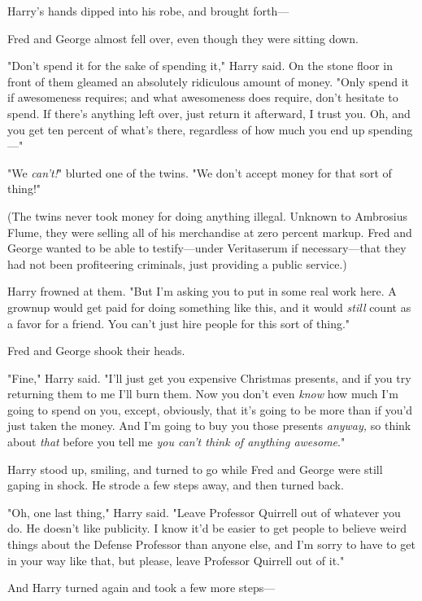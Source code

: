 Harry's hands dipped into his robe, and brought forth---

Fred and George almost fell over, even though they were sitting down.

"Don't spend it for the sake of spending it," Harry said. On the stone floor in
front of them gleamed an absolutely ridiculous amount of money. "Only spend it
if awesomeness requires; and what awesomeness does require, don't hesitate to
spend. If there's anything left over, just return it afterward, I trust you.
Oh, and you get ten percent of what's there, regardless of how much you end up
spending\mbox{---}"

"We \emph{can't!}" blurted one of the twins. "We don't accept money for that
sort of thing!"

(The twins never took money for doing anything illegal. Unknown to Ambrosius
Flume, they were selling all of his merchandise at zero percent markup. Fred
and George wanted to be able to testify---under Veritaserum if necessary---that
they had not been profiteering criminals, just providing a public service.)

Harry frowned at them. "But I'm asking you to put in some real work here. A
grownup would get paid for doing something like this, and it would \emph{still}
count as a favor for a friend. You can't just hire people for this sort of
thing."

Fred and George shook their heads.

"Fine," Harry said. "I'll just get you expensive Christmas presents, and if you
try returning them to me I'll burn them. Now you don't even \emph{know} how
much I'm going to spend on you, except, obviously, that it's going to be more
than if you'd just taken the money. And I'm going to buy you those presents
\emph{anyway,} so think about \emph{that} before you tell me \emph{you can't
think of anything awesome}."

Harry stood up, smiling, and turned to go while Fred and George were still
gaping in shock. He strode a few steps away, and then turned back.

"Oh, one last thing," Harry said. "Leave Professor Quirrell out of whatever you
do. He doesn't like publicity. I know it'd be easier to get people to believe
weird things about the Defense Professor than anyone else, and I'm sorry to
have to get in your way like that, but please, leave Professor Quirrell out of
it."

And Harry turned again and took a few more steps---

